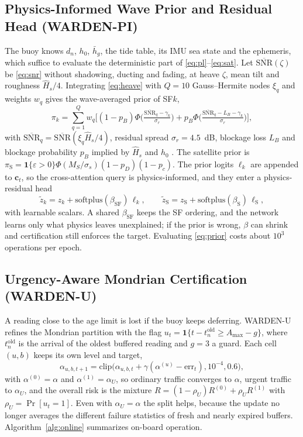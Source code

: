 \documentclass[journal]{IEEEtran}\def\WARDENieee{1}%
\newcommand{\Hhat}{\hat H_s}
\begin{document}
\subsection{Physics-Informed Wave Prior and Residual Head (WARDEN-PI)}
The buoy knows $d_n$, $h_0$, $\bar h_g$, the tide table, its IMU sea state and the ephemeris, which suffice to evaluate the deterministic part of \eqref{eq:pl}--\eqref{eq:sat}. Let $\overline{\mathrm{SNR}}(\zeta)$ be \eqref{eq:snr} without shadowing, ducting and fading, at heave $\zeta$, mean tilt and roughness $\Hhat/4$. Integrating \eqref{eq:heave} with $Q=10$ Gauss--Hermite nodes $\xi_q$ and weights $w_q$ gives the wave-averaged prior of SF$k$,
\begin{equation}
\pi_k=\sum_{q=1}^{Q}w_q\Big[(1-p_B)\Phi\Big(\tfrac{\overline{\mathrm{SNR}}_q-\gamma_k}{\sigma_r}\Big)+p_B\Phi\Big(\tfrac{\overline{\mathrm{SNR}}_q-L_B-\gamma_k}{\sigma_r}\Big)\Big],\label{eq:prior}
\end{equation}
with $\overline{\mathrm{SNR}}_q=\overline{\mathrm{SNR}}(\xi_q\Hhat/4)$, residual spread $\sigma_r=4.5$~dB, blockage loss $L_B$ and blockage probability $p_B$ implied by $\Hhat$ and $h_0$ \cite{b8}. The satellite prior is $\pi_{\mathrm S}=\mathbf{1}\{\varepsilon>0\}\Phi(M_S/\sigma_s)(1-p_D)(1-p_c)$. The prior logits $\ell_k$ are appended to $\mathbf{c}_t$, so the cross-attention query is physics-informed, and they enter a physics-residual head
\begin{equation}
\tilde z_k=z_k+\mathrm{softplus}(\beta_{\mathrm{SF}})\,\ell_k,\qquad \tilde z_{\mathrm S}=z_{\mathrm S}+\mathrm{softplus}(\beta_{\mathrm S})\,\ell_{\mathrm S},\label{eq:residual}
\end{equation}
with learnable scalars. A shared $\beta_{\mathrm{SF}}$ keeps the SF ordering, and the network learns only what physics leaves unexplained; if the prior is wrong, $\beta$ can shrink and certification still enforces the target. Evaluating \eqref{eq:prior} costs about $10^3$ operations per epoch.

\subsection{Urgency-Aware Mondrian Certification (WARDEN-U)}
A reading close to the age limit is lost if the buoy keeps deferring. WARDEN-U refines the Mondrian partition with the flag $u_t=\mathbf{1}\{t-t^{\mathrm{old}}_n\ge A_{\max}-g\}$, where $t^{\mathrm{old}}_n$ is the arrival of the oldest buffered reading and $g=3$ a guard. Each cell $(u,b)$ keeps its own level and target,
\begin{equation}
\alpha_{u,b,t+1}=\mathrm{clip}\big(\alpha_{u,b,t}+\gamma(\alpha^{(u)}-\mathrm{err}_t),10^{-4},0.6\big),\label{eq:urgent}
\end{equation}
with $\alpha^{(0)}=\alpha$ and $\alpha^{(1)}=\alpha_U$, so ordinary traffic converges to $\alpha$, urgent traffic to $\alpha_U$, and the overall risk is the mixture $R=(1-\rho_U)R^{(0)}+\rho_U R^{(1)}$ with $\rho_U=\Pr[u_t=1]$. Even with $\alpha_U=\alpha$ the split helps, because the update no longer averages the different failure statistics of fresh and nearly expired buffers. Algorithm~\ref{alg:online} summarizes on-board operation.
\end{document}
